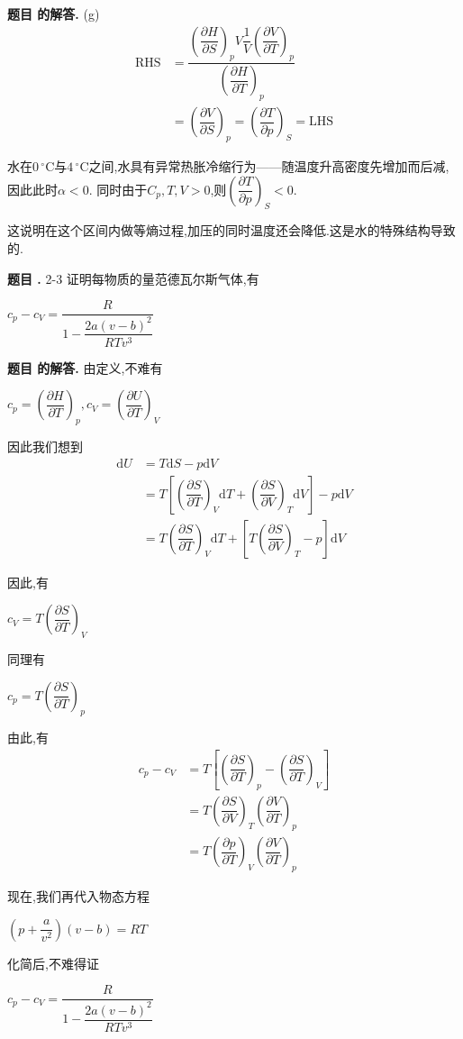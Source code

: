 \documentclass[12pt, a4paper, oneside]{ctexart}
\newcounter{problemname}
\newenvironment{problem}
  {\begin{shaded}\stepcounter{problemname}\par\noindent\textbf{题目 \theproblemname. }}
  {\end{shaded}\par}
\newenvironment{solution}
  {\par\noindent\textbf{题目 \theproblemname 的解答. }}
  {\par}
\newcommand{\tpar}[3]{\left(\dfrac{\partial #1}{\partial #2}\right)_{#3}}
\begin{document}
\begin{solution}
  (g)
  \begin{align*}
    \mathrm{RHS} &= \dfrac{\tpar{H}{S}{p} V\dfrac{1}{V} \tpar{V}{T}{p}}{\tpar{H}{T}{p}} \\
    &=\tpar{V}{S}{p} = \tpar{T}{p}{S} = \mathrm{LHS}
  \end{align*}

  水在$0\,^\circ\mathrm{C}$与$4\,^\circ\mathrm{C}$之间,水具有异常热胀冷缩行为——随温度升高密度先增加而后减,因此此时$\alpha<0$.
  同时由于$C_p,T,V>0$,则$\tpar{T}{p}{S} < 0$.

  这说明在这个区间内做等熵过程,加压的同时温度还会降低.这是水的特殊结构导致的.
\end{solution}

\begin{problem}{2-3}
  证明每物质的量范德瓦尔斯气体,有

  \centerline{$c_p - c_V = \dfrac{R}{1 - \dfrac{2a(v-b)^2}{RTv^3}}$}
\end{problem}

\begin{solution}
  由定义,不难有

  \centerline{$c_p = \tpar{H}{T}{p},c_V = \tpar{U}{T}{V}$}
  
  因此我们想到
  \begin{align*}
    \mathrm{d} U &= T \mathrm{d}S - p \mathrm{d}V\\
    &=T \left[\tpar{S}{T}{V} \mathrm{d}T + \tpar{S}{V}{T} \mathrm{d}V\right] - p\mathrm{d}V \\
    &=T\tpar{S}{T}{V} \mathrm{d}T + \left[ T\tpar{S}{V}{T} - p\right] \mathrm{d}V
  \end{align*}

  因此,有

  \centerline{$c_V = T \tpar{S}{T}{V}$}

  同理有

  \centerline{$c_p = T \tpar{S}{T}{p}$}

  由此,有
  \begin{align*}
    c_p - c_V &= T \left[ \tpar{S}{T}{p} - \tpar{S}{T}{V}\right] \\
    &= T \tpar{S}{V}{T} \tpar{V}{T}{p} \\
    &= T \tpar{p}{T}{V} \tpar{V}{T}{p}
  \end{align*}

  现在,我们再代入物态方程

  \centerline{$\left(p+\dfrac{a}{v^2}\right)\left(v-b\right) = RT$}

  化简后,不难得证

  \centerline{$c_p - c_V = \dfrac{R}{1 - \dfrac{2a(v-b)^2}{RTv^3}}$}
\end{solution}
\end{document}
